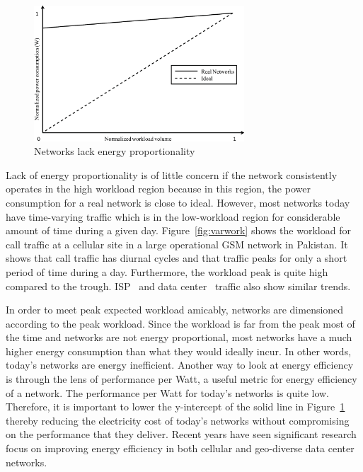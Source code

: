 \begin{figure}
\centering
\includegraphics[width=0.7\textwidth]{pics/enerprop.eps}
\caption{Networks lack energy proportionality}
\label{fig:ener-prop}
\end{figure} 

Lack of energy proportionality is of little concern if the network consistently operates in the high workload region because in this region, the power consumption for a real network is close to ideal. However, most networks today have time-varying traffic which is in the low-workload region for considerable amount of time during a given day. Figure~\ref{fig:varwork} shows the workload for call traffic at a cellular site in a large operational GSM network in Pakistan. It shows that call traffic has diurnal cycles and that traffic peaks for only a short period of time during a day. Furthermore, the workload peak is quite high compared to the trough. ISP~\cite{1248656} and data center~\cite{10.1109/MC.2007.443} traffic also show similar trends. 

In order to meet peak expected workload amicably, networks are dimensioned according to the peak workload. Since the workload is far from the peak most of the time and networks are not energy proportional, most networks have a much higher energy consumption than what they would ideally incur. In other words, today's networks are energy inefficient. Another way to look at energy efficiency is through the lens of performance per Watt, a useful metric for energy efficiency of a network. The performance per Watt for today's networks is quite low. Therefore, it is important to lower the y-intercept of the solid line in Figure~\ref{fig:ener-prop} thereby reducing the electricity cost of today's networks without compromising on the performance that they deliver. Recent years have seen significant research focus on improving energy efficiency in both cellular and geo-diverse data center networks.

